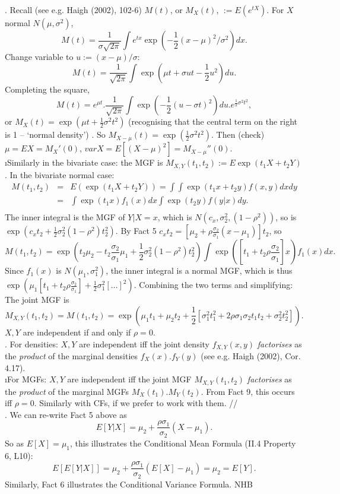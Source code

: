 \documentclass[12pt]{article}
\begin{document}
. Recall (see e.g. Haigh (2002), 102-6) $M(t)$,
or $M_X(t)$, $:= E(e^{tX})$.  For $X$ normal $N(\mu, {\sigma}^2)$,
\[
M(t) = \frac{1}{{\sigma} \sqrt{2 \pi}} \int e^{tx}
\exp(-\frac{1}{2} (x - \mu)^2/{\sigma}^2) dx.
\]
Change variable to $u := (x - \mu)/\sigma$:
\[
M(t) = \frac{1}{\sqrt{2 \pi}} \int \exp(\mu t + \sigma ut -
\frac{1}{2}u^2) du.
\]
Completing the square,
\[
M(t) = e^{\mu t}.\frac{1}{\sqrt{2 \pi}} \int \exp(-\frac{1}{2}(u-
\sigma t)^2) du. e^{\frac{1}{2} {\sigma}^2 t^2},
\]
or $M_X(t) = \exp(\mu t + \frac{1}{2}{\sigma}^2 t^2)$ (recognising
that the central term on the right is 1 -- `normal density') . So
$M_{X - \mu} (t) = \exp(\frac{1}{2}{\sigma}^2 t^2)$. Then (check)
$\mu =EX = M_X'(0)$, $var X = E[(X - \mu)^2] = M_{X - \mu}''(0)$.\\
\i Similarly in the bivariate case: the MGF is $M_{X,Y}(t_1, t_2)
:= E \exp(t_1 X + t_2 Y)$.  In the bivariate normal case:
\begin{eqnarray*}
M(t_1, t_2)
&=& E(\exp(t_1 X + t_2 Y)) = \int \int \exp(t_1 x + t_2 y) f(x,y) dxdy\\
&=& \int \exp(t_1 x) f_1 (x) dx \int \exp(t_2 y) f(y \vert x) dy.\\
\end{eqnarray*}
The inner integral is the MGF of $Y \vert X=x$, which is
$N(c_x,{\sigma}_2^2, (1 - {\rho}^2))$, so is $\exp(c_x t_2 +
\frac{1}{2}{\sigma}_2^2 (1 - {\rho}^2) t_2^2)$. By Fact 5 $c_x t_2
=[{\mu}_2 + \rho \frac{{\sigma}_2}{{\sigma}_1} (x -{\mu}_1)]t_2$,
so
\[
M(t_1,t_2) = \exp(t_2 {\mu}_2 - t_2 \frac{{\sigma}_2}{{\sigma}_1}
{\mu}_1 + \frac{1}{2}{\sigma}_2^2 (1 - {\rho}^2) t_2^2) \int
\exp([t_1 + t_2 \rho \frac{{\sigma}_2}{{\sigma}_1}]x) f_1(x) dx.
\]
Since $f_1(x)$ is $N({\mu}_1,{\sigma}_1^2)$, the inner integral is
a normal MGF, which is thus $\exp({\mu}_1[t_1 + t_2 \rho
\frac{{\sigma}_2}{{\sigma}_1}] + \frac{1}{2} {\sigma}_1^2
[\ldots]^2)$. Combining the two terms and simplifying: \\
 The joint MGF is
\[
M_{X,Y}(t_1,t_2) = M(t_1,t_2) = \exp({\mu}_1 t_1 + {\mu}_2 t_2 +
\frac{1}{2} [{\sigma}_1^2 t_1^2 + 2 \rho {\sigma}_1 {\sigma}_2 t_1
t_2 + {\sigma}_2^2 t_2^2]).
\]
 $X,Y$ are independent if and only if $\rho = 0$.\\

. For densities: $X,Y$ are independent iff the
joint density $f_{X,Y}(x,y)$ {\it factorises} as the {\it product}
of the marginal densities $f_X(x).f_Y(y)$ (see e.g. Haigh (2002),
Cor. 4.17).\\
\i For MGFs: $X,Y$ are independent iff the joint MGF $M_{X,Y}(t_1,
t_2)$ {\it factorises} as the {\it product} of the marginal MGFs
$M_X(t_1).M_Y(t_2)$.  From Fact 9, this occurs iff $\rho = 0$.
Similarly with CFs, if we prefer to work with them. // \\

.  We can re-write Fact 5 above as
$$
E[Y | X] = {\mu}_2 + \frac{\rho { \sigma}_1}{{\sigma}_2} (X - {\mu}_1).
$$
So as $E[X] = {\mu}_1$, this illustrates the Conditional Mean Formula (II.4 Property 6, L10):
$$
E[ E[Y | X]] = {\mu}_2 + \frac{\rho { \sigma}_1}{{\sigma}_2} (E[X] - {\mu}_1) = {\mu}_2 = E[Y]. 
$$
Similarly, Fact 6 illustrates the Conditional Variance Formula.             \hfil NHB \break
\end{document}
